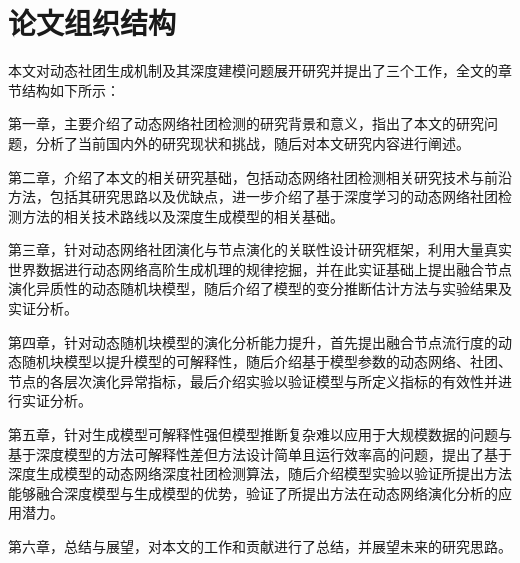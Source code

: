 \section{论文组织结构}
本文对动态社团生成机制及其深度建模问题展开研究并提出了三个工作，全文的章节结构如下所示：



第一章，主要介绍了动态网络社团检测的研究背景和意义，指出了本文的研究问题，分析了当前国内外的研究现状和挑战，随后对本文研究内容进行阐述。

第二章，介绍了本文的相关研究基础，包括动态网络社团检测相关研究技术与前沿方法，包括其研究思路以及优缺点，进一步介绍了基于深度学习的动态网络社团检测方法的相关技术路线以及深度生成模型的相关基础。

第三章，针对动态网络社团演化与节点演化的关联性设计研究框架，利用大量真实世界数据进行动态网络高阶生成机理的规律挖掘，并在此实证基础上提出融合节点演化异质性的动态随机块模型，随后介绍了模型的变分推断估计方法与实验结果及实证分析。

第四章，针对动态随机块模型的演化分析能力提升，首先提出融合节点流行度的动态随机块模型以提升模型的可解释性，随后介绍基于模型参数的动态网络、社团、节点的各层次演化异常指标，最后介绍实验以验证模型与所定义指标的有效性并进行实证分析。

第五章，针对生成模型可解释性强但模型推断复杂难以应用于大规模数据的问题与基于深度模型的方法可解释性差但方法设计简单且运行效率高的问题，提出了基于深度生成模型的动态网络深度社团检测算法，随后介绍模型实验以验证所提出方法能够融合深度模型与生成模型的优势，验证了所提出方法在动态网络演化分析的应用潜力。

第六章，总结与展望，对本文的工作和贡献进行了总结，并展望未来的研究思路。



